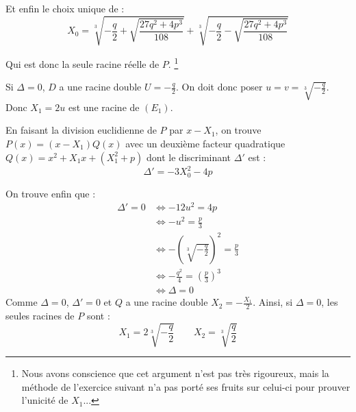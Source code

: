 \documentclass[]{../templates/homework}
\begin{document}
Et enfin le choix unique de :
$$X_0 = \sqrt[3]{-\frac {q}{2} + \sqrt {\frac {27q^2 + 4p^3}{108}} } + \sqrt[3]{-\frac {q}{2} - \sqrt {\frac {27q^2 + 4p^3}{108}} }$$

Qui est donc la seule racine réelle de $P$. \footnote{Nous avons conscience que cet argument n'est pas très rigoureux, mais la méthode de l'exercice suivant n'a pas porté ses fruits sur celui-ci pour prouver l'unicité de $X_1$...}

\subproblem Si $\Delta = 0$, $D$ a une racine double $U = -\frac q {2}$. On doit donc poser $u = v = \sqrt[3]{-\frac q 2}$. Donc $X_1 = 2u$ est une racine de $(E_1)$.


En faisant la division euclidienne de $P$ par $x-X_1$, on trouve $P(x) = (x-X_1)Q(x)$ avec un deuxième facteur quadratique $Q(x) = x^2 + X_1x + (X_1^2 + p)$ dont le discriminant $\Delta'$ est :
$$\Delta' = -3X_0^2 - 4p$$

On trouve enfin que :
\begin{align*}
	\Delta' = 0 &\iff -12u^2 = 4p \\
	&\iff -u^2 = \frac p 3\\
	&\iff -(\sqrt[3]{-\frac q 2})^2 = \frac p3\\
	&\iff -\frac {q^2} 4 = (\frac p 3)^3\\
	&\iff \Delta = 0
\end{align*}
Comme $\Delta = 0$, $\Delta' = 0$ et $Q$ a une racine double $X_2 = -\frac {X_1} 2$.
Ainsi, si $\Delta = 0$, les seules racines de $P$ sont :
\begin{equation*}
	X_1 = 2\sqrt[3]{-\frac q 2} \qquad X_2 = \sqrt[3]{\frac q 2}
\end{equation*}
\end{document}
